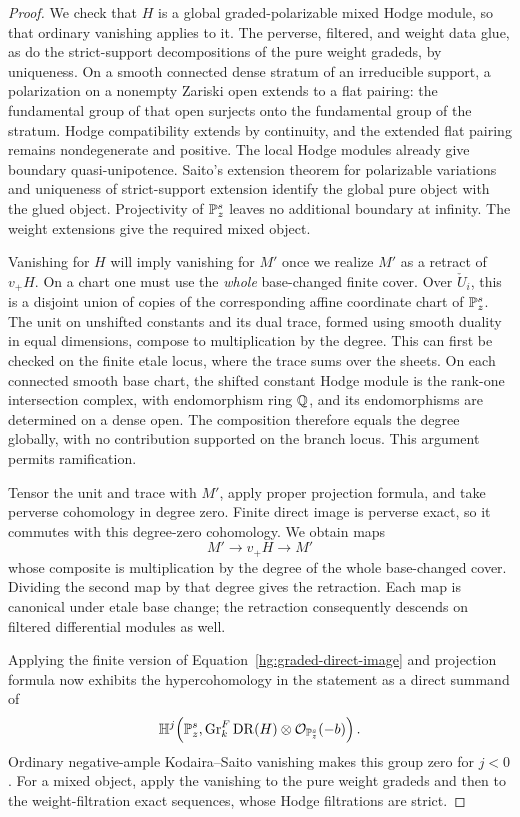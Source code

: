 \begin{proof}
We check that \(H\) is a global graded-polarizable mixed Hodge
module, so that ordinary vanishing applies to it.  The perverse,
filtered, and weight data glue, as do the strict-support
decompositions of the pure weight gradeds, by uniqueness.  On a
smooth connected dense stratum of an irreducible support, a
polarization on a nonempty Zariski open extends to a flat pairing:
the fundamental group of that open surjects onto the fundamental
group of the stratum.  Hodge compatibility extends by continuity,
and the extended flat pairing remains nondegenerate and positive.
The local Hodge modules already give boundary quasi-unipotence.
Saito's extension theorem for polarizable variations
\cite[Section~3.b]{Saito1990} and uniqueness of strict-support
extension identify the global pure object with the glued object.
Projectivity of \(\mathbb{P}^s_z\) leaves no additional boundary at
infinity.  The weight extensions give the required mixed object.

Vanishing for \(H\) will imply vanishing for \(M'\) once we
realize \(M'\) as a retract of \(v_+H\).  On a chart one
must use the \emph{whole} base-changed finite cover.  Over
\(\check U_i\), this is a disjoint union of copies of the
corresponding affine coordinate chart of \(\mathbb{P}^s_z\).  The unit
on unshifted constants and its dual trace, formed using smooth
duality in equal dimensions, compose to multiplication by the
degree.  This can first be checked on the finite etale locus,
where the trace sums over the sheets.  On each connected smooth
base chart, the shifted constant Hodge module is the rank-one
intersection complex, with endomorphism ring \(\mathbb{Q}\), and its
endomorphisms are determined on a dense open.  The composition
therefore equals the degree globally, with no contribution
supported on the branch locus.  This argument permits
ramification.

Tensor the unit and trace with \(M'\), apply proper projection
formula, and take perverse cohomology in degree zero.  Finite
direct image is perverse exact, so it commutes with this
degree-zero cohomology.  We obtain maps
\[
 M'\longrightarrow v_+H\longrightarrow M'
\]
whose composite is multiplication by the degree of the whole
base-changed cover.  Dividing the second map by that degree
gives the retraction.  Each map is canonical under etale base change; the
retraction consequently descends on filtered differential modules
as well.

Applying the finite version of
Equation~\eqref{hg:graded-direct-image} and projection formula
now exhibits the hypercohomology in the statement as a direct
summand of
\[
 \mathbb H^j\!\left(
   \mathbb{P}^s_z,\operatorname{Gr}^F_k\operatorname{DR}(H)\otimes\mathcal{O}_{\mathbb{P}^s_z}(-b)
 \right).
\]
Ordinary negative-ample Kodaira--Saito vanishing makes this group
zero for \(j<0\).  For a mixed object, apply the vanishing to
the pure weight gradeds and then to the weight-filtration exact
sequences, whose Hodge filtrations are strict.
\end{proof}

